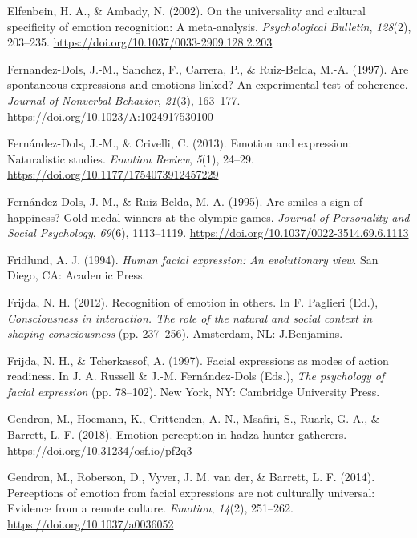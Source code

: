 \documentclass[
  english,
  doc]{apa7}
\newlength{\cslhangindent}
\newenvironment{cslreferences}%
  {\setlength{\parindent}{0pt}%
  \everypar{\setlength{\hangindent}{\cslhangindent}}\ignorespaces}%
  {\par}
\begin{document}
\begin{cslreferences}
\leavevmode\hypertarget{ref-elfenbein2002universality}{}%
Elfenbein, H. A., \& Ambady, N. (2002). On the universality and cultural specificity of emotion recognition: A meta-analysis. \emph{Psychological Bulletin}, \emph{128}(2), 203--235. \url{https://doi.org/10.1037/0033-2909.128.2.203}

\leavevmode\hypertarget{ref-fernandez1997spontaneous}{}%
Fernandez-Dols, J.-M., Sanchez, F., Carrera, P., \& Ruiz-Belda, M.-A. (1997). Are spontaneous expressions and emotions linked? An experimental test of coherence. \emph{Journal of Nonverbal Behavior}, \emph{21}(3), 163--177. \url{https://doi.org/10.1023/A:1024917530100}

\leavevmode\hypertarget{ref-fernandez2013emotion}{}%
Fernández-Dols, J.-M., \& Crivelli, C. (2013). Emotion and expression: Naturalistic studies. \emph{Emotion Review}, \emph{5}(1), 24--29. \url{https://doi.org/10.1177/1754073912457229}

\leavevmode\hypertarget{ref-fernandez1995smiles}{}%
Fernández-Dols, J.-M., \& Ruiz-Belda, M.-A. (1995). Are smiles a sign of happiness? Gold medal winners at the olympic games. \emph{Journal of Personality and Social Psychology}, \emph{69}(6), 1113--1119. \url{https://doi.org/10.1037/0022-3514.69.6.1113}

\leavevmode\hypertarget{ref-fridlund1994human}{}%
Fridlund, A. J. (1994). \emph{Human facial expression: An evolutionary view}. San Diego, CA: Academic Press.

\leavevmode\hypertarget{ref-frijda2012recognition}{}%
Frijda, N. H. (2012). Recognition of emotion in others. In F. Paglieri (Ed.), \emph{Consciousness in interaction. The role of the natural and social context in shaping consciousness} (pp. 237--256). Amsterdam, NL: J.Benjamins.

\leavevmode\hypertarget{ref-frijda1997facial}{}%
Frijda, N. H., \& Tcherkassof, A. (1997). Facial expressions as modes of action readiness. In J. A. Russell \& J.-M. Fernández-Dols (Eds.), \emph{The psychology of facial expression} (pp. 78--102). New York, NY: Cambridge University Press.

\leavevmode\hypertarget{ref-gendron2018emotion}{}%
Gendron, M., Hoemann, K., Crittenden, A. N., Msafiri, S., Ruark, G. A., \& Barrett, L. F. (2018). Emotion perception in hadza hunter gatherers. \url{https://doi.org/10.31234/osf.io/pf2q3}

\leavevmode\hypertarget{ref-gendron2014perceptions}{}%
Gendron, M., Roberson, D., Vyver, J. M. van der, \& Barrett, L. F. (2014). Perceptions of emotion from facial expressions are not culturally universal: Evidence from a remote culture. \emph{Emotion}, \emph{14}(2), 251--262. \url{https://doi.org/10.1037/a0036052}


\end{cslreferences}
\end{document}
